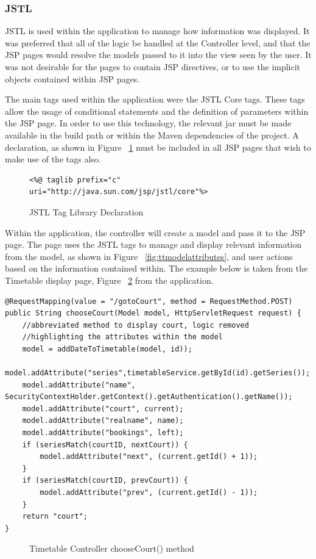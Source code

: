 \subsubsection{JSTL}

JSTL is used within the application to manage how information was displayed. It was preferred that all of the logic be handled at the Controller level, and that the JSP pages would resolve the models passed to it into the view seen by the user. It was not desirable for the pages to contain JSP directives, or to use the implicit objects contained within JSP pages. 

The main tags used within the application were the JSTL Core tags.  These tags allow the usage of conditional statements and the definition of parameters within the JSP page. In order to use this technology, the relevant jar must be made available in the build path or within the Maven dependencies of the project. A declaration, as shown in Figure ~\ref{fig:jstldec} must be included in all JSP pages that wish to make use of the tags also.\newline

\begin{figure}[H]
\begin{lstlisting}
<%@ taglib prefix="c" uri="http://java.sun.com/jsp/jstl/core"%>
\end{lstlisting}
\caption{JSTL Tag Library Declaration}
\label{fig:jstldec}
\end{figure}

Within the application, the controller will create a model and pass it to the JSP page. The page uses the JSTL tags to manage and display relevant information from the model, as shown in Figure ~\ref{fig:ttmodelattributes}, and user actions based on the information contained within. The example below is taken from the Timetable display page, Figure ~\ref{fig:ttcontrollerchoosecourt} from the application.\newline

\begin{lstlisting}
@RequestMapping(value = "/gotoCourt", method = RequestMethod.POST)
public String chooseCourt(Model model, HttpServletRequest request) {
	//abbreviated method to display court, logic removed
	//highlighting the attributes within the model
	model = addDateToTimetable(model, id));
	model.addAttribute("series",timetableService.getById(id).getSeries());
	model.addAttribute("name", SecurityContextHolder.getContext().getAuthentication().getName());
	model.addAttribute("court", current);
	model.addAttribute("realname", name);
	model.addAttribute("bookings", left);
	if (seriesMatch(courtID, nextCourt)) {
		model.addAttribute("next", (current.getId() + 1));
	}
	if (seriesMatch(courtID, prevCourt)) {
		model.addAttribute("prev", (current.getId() - 1));
	}
	return "court";
}
\end{lstlisting}	
\begin{figure}[H]
\caption{Timetable Controller chooseCourt() method}
\label{fig:ttcontrollerchoosecourt}
\end{figure}

